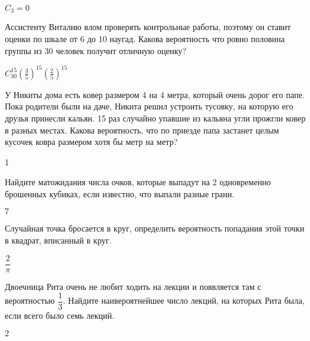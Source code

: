 \documentclass[12pt, addpoints, answers]{exam} %
\begin{document}
\begin{questions}
\begin{solution}
 $C_3=0$
\end{solution}


\question Ассистенту Виталию влом проверять контрольные работы,  поэтому он ставит оценки по шкале от 6 до 10 наугад. Какова вероятность что ровно половина группы из 30 человек получит отличную оценку?


\begin{solution}
 $C_{30}^{15}\left(\frac{3}{5}\right)^{15}\left(\frac{2}{5}\right)^{15}$
\end{solution}

\question У Никиты дома есть ковер размером 4 на 4 метра, который очень дорог его папе. Пока родители были на даче, Никита решил устроить тусовку, на которую его друзья принесли кальян. 15 раз случайно упавшие из кальяна угли прожгли ковер в разных местах. Какова вероятность, что по приезде папа застанет целым кусочек ковра размером хотя бы метр на метр?

\begin{solution}
 1
\end{solution}


\question Найдите матожидания числа очков, которые выпадут на 2 одновременно брошенных кубиках, если известно, что выпали разные грани.

\begin{solution}
 $7$
\end{solution}

\question Случайная точка бросается в круг, определить вероятность попадания этой точки в квадрат, вписанный в круг.

\begin{solution}
 $\dfrac{2}{\pi}$
\end{solution}
\question Двоечница Рита очень не любит ходить на лекции и появляется там с вероятностью $\dfrac13$. Найдите наивероятнейшее число лекций, на которых Рита была, если всего было семь лекций.
\begin{solution}
$2$
\end{solution}

\end{questions}
\end{document}
